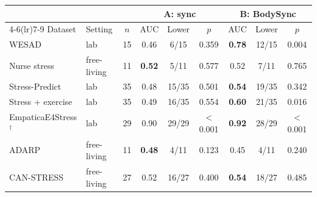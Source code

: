 \begin{tabular}{llccccccc}
\toprule
 & & & \multicolumn{3}{c}{A: sync} & \multicolumn{3}{c}{B: BodySync} \\
\cmidrule(lr){4-6}\cmidrule(lr){7-9}
Dataset & Setting & $n$ & AUC & Lower & $p$ & AUC & Lower & $p$ \\
\midrule
WESAD & lab & 15 & 0.46 & 6/15 & 0.359 & \textbf{0.78} & 12/15 & 0.004 \\
Nurse stress & free-living & 11 & \textbf{0.52} & 5/11 & 0.577 & 0.52 & 7/11 & 0.765 \\
Stress-Predict & lab & 35 & 0.48 & 15/35 & 0.501 & \textbf{0.54} & 19/35 & 0.342 \\
Stress + exercise & lab & 35 & 0.49 & 16/35 & 0.554 & \textbf{0.60} & 21/35 & 0.016 \\
EmpaticaE4Stress$^\dagger$ & lab & 29 & 0.90 & 29/29 & $<$0.001 & \textbf{0.92} & 28/29 & $<$0.001 \\
ADARP & free-living & 11 & \textbf{0.48} & 4/11 & 0.123 & 0.45 & 4/11 & 0.240 \\
CAN-STRESS & free-living & 27 & 0.52 & 16/27 & 0.400 & \textbf{0.54} & 18/27 & 0.485 \\
\bottomrule
\end{tabular}

